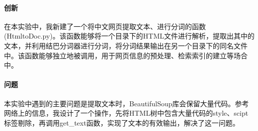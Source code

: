 \documentclass{article}
\begin{document}
\paragraph{创新}
在本实验中，我新建了一个将中文网页提取文本、进行分词的函数(HtmltoDoc.py)。该函数能够将一个目录下的HTML文件进行解析，提取出其中的文本，并利用结巴分词器进行分词，将分词结果输出在另一个目录下的同名文件中。该函数能够独立地被调用，用于网页信息的预处理、检索索引的建立等场合中。


\paragraph{问题}
本实验中遇到的主要问题是提取文本时，BeautifulSoup库会保留大量代码。参考网络上的信息，我设计了一个操作，先将HTML树中包含大量代码的style、scipt标签剔除，再调用get\_text函数，实现了文本的有效输出，解决了这一问题。
\end{document}
